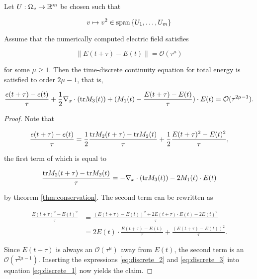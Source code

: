\begin{corollary}\label{thm:electric_energy}
    Let $U : \Omega_v \to \mathbb{R}^m$ be chosen such that 

    \begin{equation}
        v \mapsto v^2 \in \text{span} \left\{ U_1, \ldots, U_m \right\} 
    \end{equation}

    Assume that the numerically computed electric field satisfies 

    \begin{equation}
        \left\| E(t + \tau) - E(t) \right\| = \mathcal{O} (\tau^\mu)
    \end{equation}
    
    for some $\mu \geq 1$. Then the time-discrete 
    continuity equation for total energy is satisfied to order $2\mu - 1$, that is,

    \begin{equation}
        \frac{e(t + \tau) - e(t)}{\tau}
        + \frac{1}{2} \nabla_x \cdot (\text{tr} M_3 (t)) 
        + (M_1 (t) - \frac{E(t + \tau) - E(t)}{\tau}) \cdot E (t)
        = \mathcal{O} (\tau^{2\mu - 1}) . 
    \end{equation}

\end{corollary}

\begin{proof}
    Note that 

    \begin{equation}\label{eq:discrete_1}
        \frac{e(t + \tau) - e(t)}{\tau} 
        = \frac{1}{2} \frac{\text{tr} M_2 (t + \tau) - \text{tr} M_2 (t)}{\tau} 
            + \frac{1}{2} \frac{E(t + \tau)^2 - E(t)^2}{\tau} ,
    \end{equation}

    the first term of which is equal to 
    
    \begin{equation}\label{eq:discrete_2}
        \frac{\text{tr} M_2 (t + \tau) - \text{tr} M_2 (t)}{\tau} 
        = - \nabla_x \cdot ( \text{tr} M_3 (t) ) - 2 M_1 (t) \cdot E (t)
    \end{equation}

    by theorem 
    \ref{thm:conservation}. The second term can be rewritten as 

    \begin{equation}\label{eq:discrete_3}
        \begin{split}
            \frac{E(t + \tau)^2 - E(t)^2}{\tau} 
            &= \frac{(E(t + \tau) - E(t))^2 + 2 E(t + \tau) \cdot E(t) - 2 E(t)^2}{\tau} \\ 
            &= 2 E(t) \cdot \frac{E(t +\tau) - E(t)}{\tau} 
                + \frac{(E(t + \tau) - E(t))^2}{\tau} . 
        \end{split}
    \end{equation}

    Since $E(t + \tau)$ is always an $\mathcal{O} (\tau^\mu)$ away from $E(t)$, the second 
    term is an $\mathcal{O} (\tau^{2\mu - 1})$. Inserting the expressions 
    \ref{eq:discrete_2} and \ref{eq:discrete_3} into equation \ref{eq:discrete_1} now 
    yields the claim. 
\end{proof}

